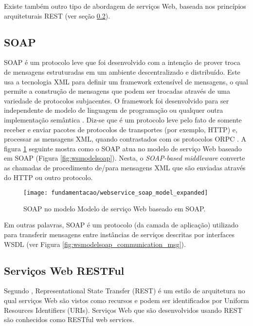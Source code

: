 Existe também outro tipo de abordagem de serviços Web, baseada nos princípios arquiteturais REST (ver seção \ref{subsec:restful}).

\subsection{SOAP}
\label{subsec:soap}
SOAP é um protocolo leve que foi desenvolvido com a intenção de prover troca de mensagens estruturadas em um ambiente descentralizado e distribuído. Este usa a tecnologia XML para definir um framework extensível de mensagens, o qual permite a construção de mensagens que podem ser trocadas através de uma variedade de protocolos subjacentes. O framework foi desenvolvido para ser independente de modelo de linguagem de programação ou qualquer outra implementação semântica \cite{w3c:soap}. Diz-se que é um protocolo leve pelo fato de somente receber e enviar pacotes de protocolos de transportes (por exemplo, HTTP) e, processar as mensagens XML, quando contrastados com os protocolos ORPC \cite{Papazoglou_slides:2008}. A figura \ref{fig:wsmodelsoap_expanded} seguinte mostra como o SOAP atua no modelo de serviço Web baseado em SOAP (Figura \ref{fig:wsmodelsoap}). Nesta, o \textit{SOAP-based middleware} converte as chamadas de procedimento de/para mensagens XML que são enviadas através do HTTP ou outro protocolo.

\begin{figure}[!htb] \centering 
  \centering
  \texttt{[image: fundamentacao/webservice\_soap\_model\_expanded]} 
  \caption{SOAP no modelo Modelo de serviço Web baseado em SOAP. \cite{Papazoglou_slides:2008}} 
  \label{fig:wsmodelsoap_expanded}
\end{figure}

Em outras palavras, SOAP é um protocolo (da camada de aplicação) utilizado para transferir mensagens entre instâncias de serviços descritas por interfaces WSDL (ver Figura \ref{fig:wsmodelsoap_communication_msg}).

\subsection{Serviços Web RESTFul}
\label{subsec:restful}
Segundo \cite{Heffelfinger:2014}, Representational State Transfer (REST) é um estilo de arquitetura no qual serviços Web são vistos como recursos e podem ser identificados por Uniform Resources Identifiers (URIs). Serviços Web que são desenvolvidos usando REST são conhecidos como RESTful web services. 

